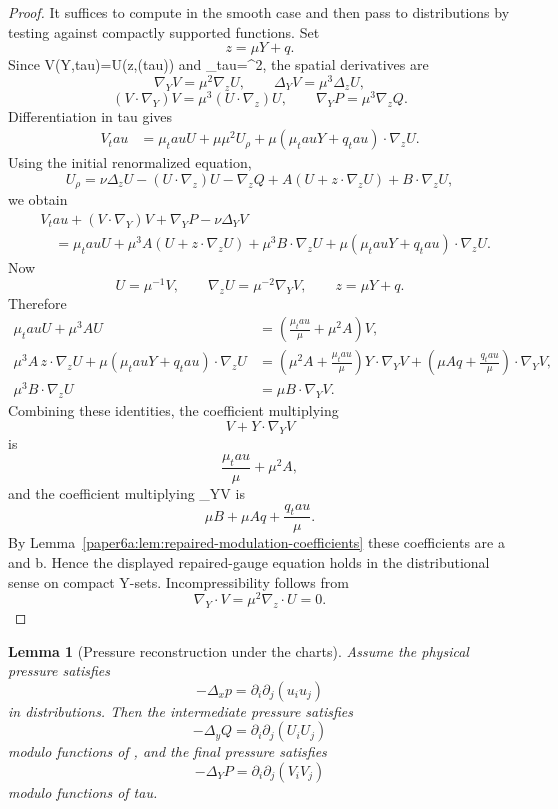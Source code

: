 \documentclass[11pt]{amsart}
\def\({}%
\def\){}%
\def\tau{tau}%
\theoremstyle{plain}
\newtheorem{lemma}[lemma]{Lemma}
\theoremstyle{definition}
\theoremstyle{remark}
\begin{document}
\begin{proof}
It suffices to compute in the smooth case and then pass to distributions by
testing against compactly supported functions.  Set
\[
  z=\mu Y+q.
\]
Since \(V(Y,\tau)=\mu U(z,\rho(\tau))\) and
\(\rho_\tau=\mu^2\), the spatial derivatives are
\[
  \nabla_YV=\mu^2\nabla_zU,\qquad
  \Delta_YV=\mu^3\Delta_zU,
\]
\[
  (V\cdot\nabla_Y)V=\mu^3(U\cdot\nabla_z)U,
  \qquad
  \nabla_YP=\mu^3\nabla_zQ.
\]
Differentiation in \(\tau\) gives
\[
\begin{aligned}
  V_\tau
  &=
  \mu_\tau U
  +\mu\mu^2U_\rho
  +\mu(\mu_\tau Y+q_\tau)\cdot\nabla_zU .
\end{aligned}
\]
Using the initial renormalized equation,
\[
  U_\rho
  =
  \nu\Delta_zU-(U\cdot\nabla_z)U-\nabla_zQ
  +A(U+z\cdot\nabla_zU)+B\cdot\nabla_zU,
\]
we obtain
\[
\begin{aligned}
&V_\tau+(V\cdot\nabla_Y)V+\nabla_YP-\nu\Delta_YV \\
&\quad =
\mu_\tau U
{}+\mu^3A(U+z\cdot\nabla_zU)
{}+\mu^3B\cdot\nabla_zU
{}+\mu(\mu_\tau Y+q_\tau)\cdot\nabla_zU .
\end{aligned}
\]
Now
\[
  U=\mu^{-1}V,
  \qquad
  \nabla_zU=\mu^{-2}\nabla_YV,
  \qquad
  z=\mu Y+q.
\]
Therefore
\[
\begin{aligned}
\mu_\tau U+\mu^3A U
&=
\left(\frac{\mu_\tau}{\mu}+\mu^2A\right)V,\\
\mu^3A\,z\cdot\nabla_zU
{}+\mu(\mu_\tau Y+q_\tau)\cdot\nabla_zU
&=
\left(\mu^2A+\frac{\mu_\tau}{\mu}\right)Y\cdot\nabla_YV
{}+\left(\mu Aq+\frac{q_\tau}{\mu}\right)\cdot\nabla_YV,\\
\mu^3B\cdot\nabla_zU
&=
\mu B\cdot\nabla_YV .
\end{aligned}
\]
Combining these identities, the coefficient multiplying
\[
  V+Y\cdot\nabla_YV
\]
is
\[
  \frac{\mu_\tau}{\mu}+\mu^2A,
\]
and the coefficient multiplying \(\nabla_YV\) is
\[
  \mu B+\mu Aq+\frac{q_\tau}{\mu}.
\]
By Lemma~\ref{paper6a:lem:repaired-modulation-coefficients} these coefficients are
\(a\) and \(b\).  Hence the displayed repaired-gauge equation holds in the
distributional sense on compact \(Y\)-sets.  Incompressibility follows from
\[
  \nabla_Y\cdot V=\mu^2\nabla_z\cdot U=0.
\]
\end{proof}

\begin{lemma}[Pressure reconstruction under the charts]
\label{paper6a:lem:pressure-reconstruction-under-charts}
Assume the physical pressure satisfies
\[
  -\Delta_xp=\partial_i\partial_j(u_iu_j)
\]
in distributions.  Then the intermediate pressure satisfies
\[
  -\Delta_yQ=\partial_i\partial_j(U_iU_j)
\]
modulo functions of \(\rho\), and the final pressure satisfies
\[
  -\Delta_YP=\partial_i\partial_j(V_iV_j)
\]
modulo functions of \(\tau\).
\end{lemma}
\end{document}
